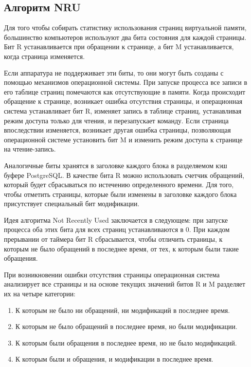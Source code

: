 \subsection{Алгоритм NRU}

Для того чтобы собирать статистику использования страниц виртуальной памяти, большинство компьютеров используют два бита состояния для каждой страницы.
Бит R устанавливается при обращении к странице, а бит M устанавливается, когда страница изменяется.

Если аппаратура не поддерживает эти биты, то они могут быть созданы с помощью механизмов операционной системы.
При запуске процесса все записи в его таблице страниц помечаются как отсутствующие в памяти.
Когда происходит обращение к странице, возникает ошибка отсутствия страницы, и операционная система устанавливает бит R, изменяет запись в таблице страниц, устанавливая режим доступа только для чтения, и перезапускает команду.
Если страница впоследствии изменяется, возникает другая ошибка страницы, позволяющая операционной системе установить бит M и изменить режим доступа к странице на чтение-запись.

Аналогичные биты хранятся в заголовке каждого блока в разделяемом кэш буфере PostgreSQL.
В качестве бита R можно использовать счетчик обращений, который будет сбрасываться по истечению определенного времени.
Для того, чтобы отметить страницы, которые были изменены в заголовке каждого блока присутствует специальный бит модификации.

Идея алгоритма Not Recently Used заключается в следующем: при запуске процесса оба этих бита для всех страниц
устанавливаются в 0. 
При каждом прерывании от таймера бит R сбрасывается, чтобы отличить страницы, к которым не было обращений в последнее время, от тех, к которым были такие обращения.

При возникновении ошибки отсутствия страницы операционная система анализирует все страницы и на основе текущих значений битов R и M разделяет их на четыре категории:
\begin{enumerate}
	\item К которым не было ни обращений, ни модификаций в последнее время.
	\item К которым не было обращений в последнее время, но были модификации.
	\item К которым были обращения в последнее время, но не было модификаций.
	\item К которым были и обращения, и модификации в последнее время.
\end{enumerate}

